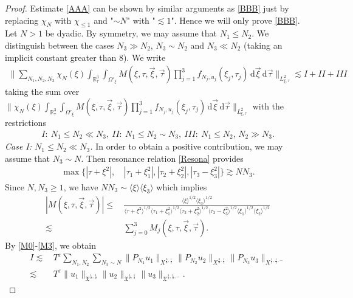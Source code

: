 \documentclass[reqno]{amsart}
\theoremstyle{Definitionl}
\theoremstyle{Definitionk}
\theoremstyle{definition}
\theoremstyle{Satzk}
\theoremstyle{Satzl}
\theoremstyle{Bemerkung}
\begin{document}
\begin{proof}
Estimate \eqref{AAA} can be shown by similar arguments as \eqref{BBB} just by replacing $\chi_N$ with $\chi_{\le1}$ and "$\sim N$" with "$\lesssim 1$". Hence we will only prove \eqref{BBB}.\\[10pt]
Let $N>1$ be dyadic. By symmetry, we may assume that $N_1\le N_2$. We distinguish between the cases $N_3\gg N_2$, $N_3\sim N_2$ and $N_3\ll N_2$ (taking an implicit constant greater than $8$). We write
\begin{align*}
\Big\|\sum_{N_1,N_2,N_3}\chi_N(\xi)\int_{\mathbb R^3_\tau}\int_{\Omega'_\xi}M(\xi,\tau,\vec\xi,\vec\tau)\prod_{j=1}^3f_{N_j,u_j}(\xi_j,\tau_j)\,\mathrm d\vec\xi\,\mathrm d\vec\tau\Big\|_{L^2_{\xi,\tau}}\lesssim I+II+III
\end{align*}
taking the sum over $\|\chi_N(\xi)\int_{\mathbb R^3_\tau}\int_{\Omega'_\xi}M(\xi,\tau,\vec\xi,\vec\tau)\prod_{j=1}^3f_{N_j,u_j}(\xi_j,\tau_j)\,\mathrm d\vec\xi\,\mathrm d\vec\tau\|_{L^2_{\xi,\tau}}$ with the restrictions
\begin{align*}
I:\ N_1\le N_2\ll N_3,\ II:\ N_1\le N_2\sim N_3,\ 
III:\ N_1\le N_2,\,N_2\gg N_3.
\end{align*}
\emph{Case I: $N_1\le N_2\ll N_3$. }In order to obtain a positive contribution, we may assume that $N_3\sim N$. Then resonance relation \eqref{Resona} provides
\begin{align*}
\max\{|\tau+\xi^2|,&\,|\tau_1+\xi_1^2|,|\tau_2+\xi_2^2|,|\tau_3-\xi_3^2|\}\gtrsim NN_3.
\end{align*}
Since $N,N_3\ge1$, we have $NN_3\sim \langle\xi\rangle\langle\xi_3\rangle$ which implies
\begin{align*}
|M(\xi,\tau,\vec\xi,\vec\tau)|\le&\, \frac{\langle\xi\rangle^{1/2}\langle\xi_3\rangle^{1/2}}{\langle\tau+\xi^2\rangle^{1/2}\langle\tau_1+\xi_1^2\rangle^{1/2}\langle\tau_2+\xi_2^2\rangle^{1/2}\langle\tau_3-\xi_3^2\rangle^{1/2}\langle\xi_1\rangle^{1/2}\langle\xi_2\rangle^{1/2}}\\
\lesssim&\, \sum_{j=0}^3M_j(\xi,\tau,\vec\xi,\vec\tau).
\end{align*}
By \eqref{M0}-\eqref{M3}, we obtain
\begin{align*}
I\lesssim&\, T^\varepsilon\sum_{N_1,N_2}\sum_{N_3\sim N}\|P_{N_1}u_1\|_{X^{\frac38,\frac12}}\|P_{N_2}u_2\|_{X^{\frac38,\frac12}}\|P_{N_3}u_3\|_{X^{\frac12,\frac12,-}}\\
\lesssim&\, T^\varepsilon\|u_1\|_{\mathfrak X^{\frac12,\frac12}}\|u_2\|_{\mathfrak X^{\frac12,\frac12}}\|u_3\|_{\mathfrak X^{\frac12,\frac12,-}}.
\end{align*}

\end{proof}
\end{document}
